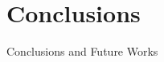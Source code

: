 \section*{Conclusions}

\begin{frame}{Conclusions and Future Works}
\end{frame}

\begin{frame}[plain,c]

\begin{center}
\end{center}



\begin{center}
\end{center}

\end{frame}
